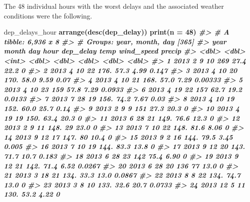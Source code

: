 \documentclass[]{book}
\newenvironment{Shaded}{\begin{snugshade}}{\end{snugshade}}
\newcommand{\CommentTok}[1]{\textcolor[rgb]{0.56,0.35,0.01}{\textit{#1}}}
\newcommand{\DataTypeTok}[1]{\textcolor[rgb]{0.13,0.29,0.53}{#1}}
\newcommand{\DecValTok}[1]{\textcolor[rgb]{0.00,0.00,0.81}{#1}}
\newcommand{\KeywordTok}[1]{\textcolor[rgb]{0.13,0.29,0.53}{\textbf{#1}}}
\newcommand{\NormalTok}[1]{#1}
\newcommand{\OperatorTok}[1]{\textcolor[rgb]{0.81,0.36,0.00}{\textbf{#1}}}
\newcommand{\StringTok}[1]{\textcolor[rgb]{0.31,0.60,0.02}{#1}}
\theoremstyle{plain}
\theoremstyle{remark}
\begin{document}
The 48 individual hours with the worst delays and the associated weather conditions were the following.

\begin{Shaded}
\begin{Highlighting}[]
\NormalTok{dep_delays_hour }\OperatorTok{%
\StringTok{  }\KeywordTok{arrange}\NormalTok{(}\KeywordTok{desc}\NormalTok{(dep_delay)) }\OperatorTok{%
\StringTok{  }\KeywordTok{print}\NormalTok{(}\DataTypeTok{n =} \DecValTok{48}\NormalTok{)}
\CommentTok{#> # A tibble: 6,936 x 8}
\CommentTok{#> # Groups:   year, month, day [365]}
\CommentTok{#>     year month   day  hour dep_delay  temp wind_speed  precip}
\CommentTok{#>    <dbl> <dbl> <int> <dbl>     <dbl> <dbl>      <dbl>   <dbl>}
\CommentTok{#>  1  2013     2     9    10      269   27.4      22.2  0      }
\CommentTok{#>  2  2013     4    10    22      176.  57.3       4.99 0.147  }
\CommentTok{#>  3  2013     4    10    20      170.  58.0       9.59 0.07   }
\CommentTok{#>  4  2013     4    10    21      168.  57.0       7.29 0.00333}
\CommentTok{#>  5  2013     4    10    23      159   57.8       7.29 0.0933 }
\CommentTok{#>  6  2013     4    19    22      157   62.7      19.2  0.0133 }
\CommentTok{#>  7  2013     7    28    19      156.  74.2       7.67 0.03   }
\CommentTok{#>  8  2013     4    10    19      152.  60.0      25.7  0.14   }
\CommentTok{#>  9  2013     2     9     9      151   27.3      20.3  0      }
\CommentTok{#> 10  2013     4    19    19      150.  63.4      20.3  0      }
\CommentTok{#> 11  2013     6    28    21      149.  76.6      12.3  0      }
\CommentTok{#> 12  2013     2     9    11      148.  29        23.0  0      }
\CommentTok{#> 13  2013     7    10    22      148.  81.6       8.06 0      }
\CommentTok{#> 14  2013     9    12    17      147.  80        10.4  0      }
\CommentTok{#> 15  2013     9     2    16      144.  79.5       3.45 0.005  }
\CommentTok{#> 16  2013     7    10    19      144.  83.3      13.8  0      }
\CommentTok{#> 17  2013     9    12    20      143.  71.7      10.7  0.183  }
\CommentTok{#> 18  2013     6    28    23      142   75.4       6.90 0      }
\CommentTok{#> 19  2013     9    12    21      142.  71.4       6.52 0.0267 }
\CommentTok{#> 20  2013     6    28    20      136   77        13.0  0      }
\CommentTok{#> 21  2013     3    18    21      134.  33.3      13.0  0.0867 }
\CommentTok{#> 22  2013     8     8    22      134.  74.7      13.0  0      }
\CommentTok{#> 23  2013     3     8    10      133.  32.6      20.7  0.0733 }
\CommentTok{#> 24  2013    12     5    11      130.  53.2       4.22 0      }
}}
\end{Highlighting}
\end{Shaded}
\end{document}
